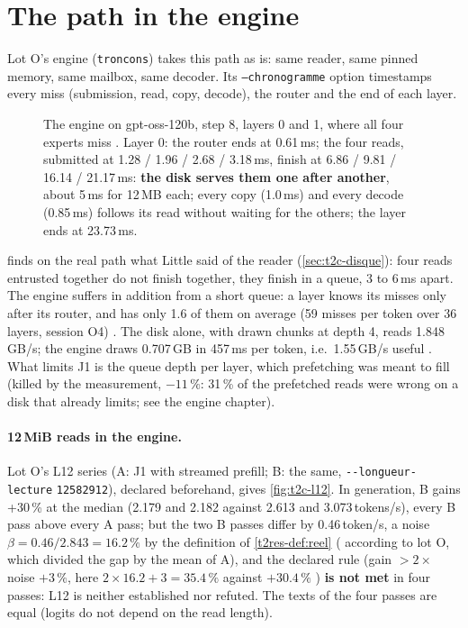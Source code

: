 \section{The path in the engine}\label{sec:t2c-moteur}

Lot O's engine (\texttt{troncons}) takes this path as is: same reader, same pinned memory, same mailbox, same decoder. Its \texttt{--chronogramme} option timestamps every miss (submission, read, copy, decode), the router and the end of each layer.

\begin{figure}[ht]
\centering
\GrapheChmCouche
\caption[The engine: two 120b layers, every miss timestamped]{The engine on gpt-oss-120b, step 8, layers 0 and 1, where all four experts miss \mes. Layer 0: the router ends at 0.61\,ms; the four reads, submitted at 1.28 / 1.96 / 2.68 / 3.18\,ms, finish at 6.86 / 9.81 / 16.14 / 21.17\,ms: \textbf{the disk serves them one after another}, about 5\,ms for 12\,MB each; every copy (1.0\,ms) and every decode (0.85\,ms) follows its read without waiting for the others; the layer ends at 23.73\,ms.}
\label{fig:t2c-couche}
\end{figure}

 finds on the real path what Little said of the reader (\cref{sec:t2c-disque}): four reads entrusted together do not finish together, they finish in a queue, 3 to 6\,ms apart. The engine suffers in addition from a short queue: a layer knows its misses only after its router, and has only 1.6 of them on average (59 misses per token over 36 layers, session O4) \mes. The disk alone, with drawn chunks at depth 4, reads 1.848\,GB/s; the engine draws 0.707\,GB in 457\,ms per token, i.e.\ 1.55\,GB/s useful \calc. What limits J1 is the queue depth per layer, which prefetching was meant to fill (killed by the measurement, $-11\,\%$: 31\,\% of the prefetched reads were wrong on a disk that already limits; see the engine chapter).

\paragraph{12\,MiB reads in the engine.} Lot O's L12 series (A: J1 with streamed prefill; B: the same, \texttt{-{}-\allowbreak longueur-\allowbreak lecture} \texttt{12582912}), declared beforehand, gives \cref{fig:t2c-l12}. In generation, B gains +30\,\% at the median (2.179 and 2.182 against 2.613 and 3.073\,tokens/s), every B pass above every A pass; but the two B passes differ by 0.46\,token/s, a noise $\beta = 0.46 / 2.843 = 16.2\,\%$ by the definition of \cref{t2res-def:reel} ( according to lot O, which divided the gap by the mean of A), and the declared rule (gain $> 2 \times$ noise $+ 3\,\%$, here $2 \times 16.2 + 3 = 35.4\,\%$ against $+30.4\,\%$ \calc) \textbf{is not met} in four passes: L12 is neither established nor refuted. The texts of the four passes are equal (logits do not depend on the read length).

